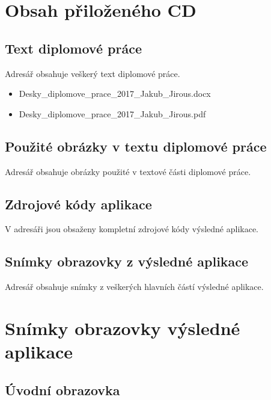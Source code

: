 \appendix

\chapter{Obsah přiloženého CD}

\section{Text diplomové práce}
Adresář obsahuje veškerý text diplomové práce. 

\begin{itemize}
\item Desky\_diplomove\_prace\_2017\_Jakub\_Jirous.docx
\item Desky\_diplomove\_prace\_2017\_Jakub\_Jirous.pdf
\end{itemize}


\section{Použité obrázky v textu diplomové práce}
Adresář obsahuje obrázky použité v textové části diplomové práce.


\section{Zdrojové kódy aplikace}
V adresáři jsou obsaženy kompletní zdrojové kódy výsledné aplikace.


\section{Snímky obrazovky z výsledné aplikace}
Adresář obsahuje snímky z veškerých hlavních částí výsledné aplikace.


\chapter{Snímky obrazovky výsledné aplikace}

\section{Úvodní obrazovka}

